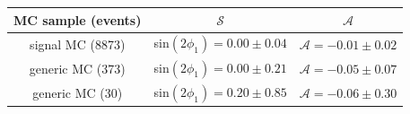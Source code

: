 \begin{table}
	\centering
\begin{tabular}{|c|c|c|}
	\hline
	MC sample (events)& $\mathcal{S}$ &  $\mathcal{A}$\\
	\hline
	signal MC (8873) & sin$(2\phi_1) = 0.00 \pm 0.04 $ &  $\mathcal{A} = -0.01 \pm 0.02$\\
	\hline
	generic MC (373) &  sin$(2\phi_1)  = 0.00 \pm 0.21$ & $\mathcal{A}  = -0.05 \pm 0.07$ \\
	\hline
	generic MC (30) & sin$(2\phi_1) = 0.20 \pm 0.85 $& $\mathcal{A} = -0.06 \pm 0.30$ \\
	\hline
\end{tabular}
\end{table}


